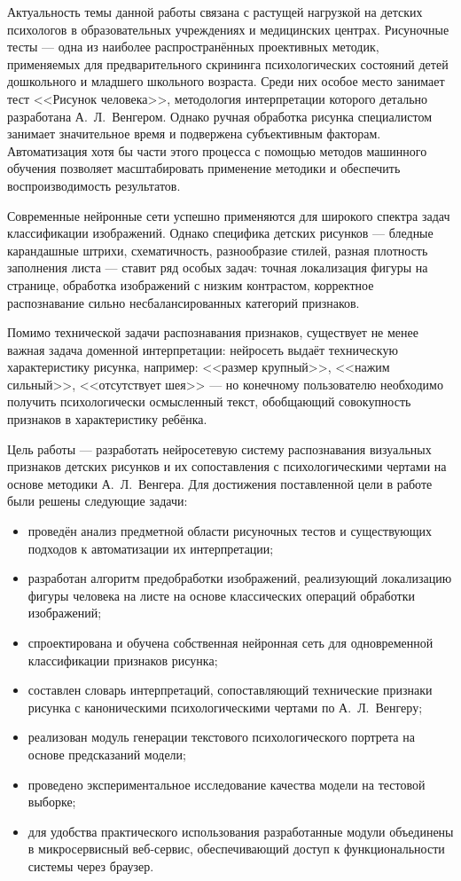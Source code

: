 \introduction %

Актуальность темы данной работы связана с растущей нагрузкой на детских психологов в образовательных учреждениях и медицинских центрах. Рисуночные тесты --- одна из наиболее распространённых проективных методик, применяемых для предварительного скрининга психологических состояний детей дошкольного и младшего школьного возраста. Среди них особое место занимает тест <<Рисунок человека>>, методология интерпретации которого детально разработана А.~Л.~Венгером. Однако ручная обработка рисунка специалистом занимает значительное время и подвержена субъективным факторам. Автоматизация хотя бы части этого процесса с помощью методов машинного обучения позволяет масштабировать применение методики и обеспечить воспроизводимость результатов.

Современные нейронные сети успешно применяются для широкого спектра задач классификации изображений. Однако специфика детских рисунков --- бледные карандашные штрихи, схематичность, разнообразие стилей, разная плотность заполнения листа --- ставит ряд особых задач: точная локализация фигуры на странице, обработка изображений с низким контрастом, корректное распознавание сильно несбалансированных категорий признаков.

Помимо технической задачи распознавания признаков, существует не менее важная задача доменной интерпретации: нейросеть выдаёт техническую характеристику рисунка, например: <<размер крупный>>, <<нажим сильный>>, <<отсутствует шея>> --- но конечному пользователю необходимо получить психологически осмысленный текст, обобщающий совокупность признаков в характеристику ребёнка.

Цель работы --- разработать нейросетевую систему распознавания визуальных признаков детских рисунков и их сопоставления с психологическими чертами на основе методики А.~Л.~Венгера. Для достижения поставленной цели в работе были решены следующие задачи:

\begin{itemize}
    \item проведён анализ предметной области рисуночных тестов и существующих подходов к автоматизации их интерпретации;
    \item разработан алгоритм предобработки изображений, реализующий локализацию фигуры человека на листе на основе классических операций обработки изображений;
    \item спроектирована и обучена собственная нейронная сеть для одновременной классификации признаков рисунка;
    \item составлен словарь интерпретаций, сопоставляющий технические признаки рисунка с каноническими психологическими чертами по А.~Л.~Венгеру;
    \item реализован модуль генерации текстового психологического портрета на основе предсказаний модели;
    \item проведено экспериментальное исследование качества модели на тестовой выборке;
    \item для удобства практического использования разработанные модули объединены в микросервисный веб-сервис, обеспечивающий доступ к функциональности системы через браузер.
\end{itemize}

